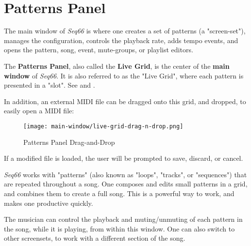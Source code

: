 %
%
%

\section{Patterns Panel}
\label{sec:patterns_panel}

   The main window of \textsl{Seq66} is
   where one creates a set of patterns (a "screen-set"),
   manages the configuration, controls the playback rate, adds tempo events,
   and opens the pattern, song, event, mute-groups, or playlist editors.

   The \textbf{Patterns Panel}, also called the \textbf{Live Grid},
   is the center of the
   \textbf{main window} of \textsl{Seq66}.
   It is also referred to as the "Live Grid", where each pattern is
   presented in a "slot".
   See  and
   .

   In addition, an external MIDI file can be dragged onto this grid,
   and dropped, to easily open a MIDI file:

\begin{figure}[H]
   \centering 
   \texttt{[image: main-window/live-grid-drag-n-drop.png]}
   \caption{Patterns Panel Drag-and-Drop}
   \label{fig:patterns_panel_drag_n_drop}
\end{figure}

   If a modified file is loaded, the user
   will be prompted to save, discard, or cancel.

   \textsl{Seq66} works with "patterns" (also known as "loops", "tracks", or
   "sequences") that are repeated throughout a song.
   One composes and edits small patterns in a grid,
   and combines them to create a full song.
   This is a powerful way to work, and makes one productive quickly.

   The musician can
   control the playback and muting/unmuting of each pattern in
   the song, while it is playing, from within this window.
   One can also switch to other screensets, to work with a different
   section of the song.

